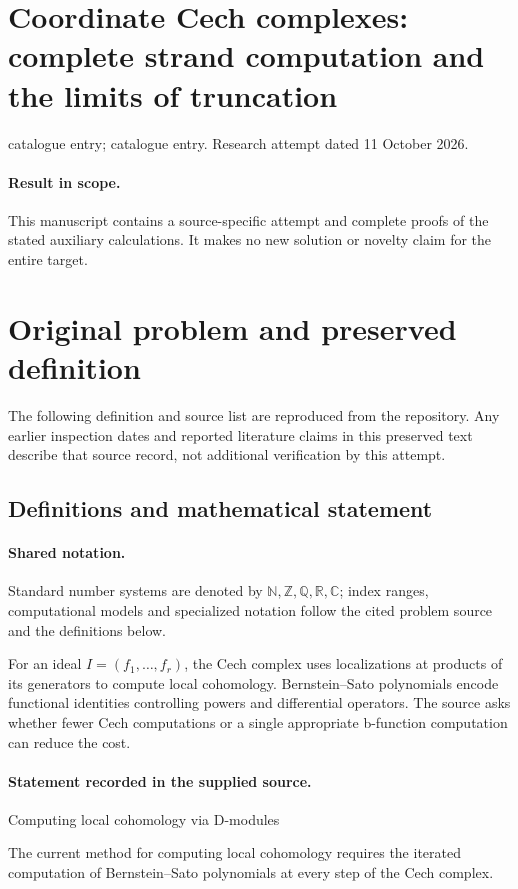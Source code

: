 \documentclass[11pt]{article}
\begin{document}
\section*{Coordinate Cech complexes: complete strand computation and the limits of truncation}
\noindent catalogue entry; catalogue entry. Research attempt dated 11 October 2026.
\paragraph{Result in scope.}This manuscript contains a source-specific attempt and complete proofs of the stated auxiliary calculations. It makes no new solution or novelty claim for the entire target.
\section{Original problem and preserved definition}
The following definition and source list are reproduced from the repository. Any earlier inspection dates and reported literature claims in this preserved text describe that source record, not additional verification by this attempt.
\subsection{Definitions and mathematical statement}

\paragraph{Shared notation.}Standard number systems are denoted by $\mathbb N,\mathbb Z,\mathbb Q,\mathbb R,\mathbb C$; index ranges, computational models and specialized notation follow the cited problem source and the definitions below.


For an ideal $I=(f_1,\ldots,f_r)$, the Cech complex uses localizations at products of its generators to compute local cohomology. Bernstein--Sato polynomials encode functional identities controlling powers and differential operators. The source asks whether fewer Cech computations or a single appropriate b-function computation can reduce the cost.
\paragraph{Statement recorded in the supplied source.}
Computing local cohomology via D-modules

The current method for computing local cohomology requires the iterated computation of Bernstein--Sato polynomials at every step of the Cech complex.
\end{document}
